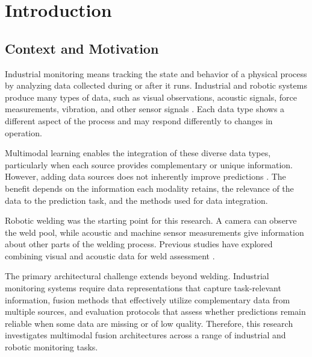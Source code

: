 
\chapter{Introduction}
\label{ch:introduction}



\section{Context and Motivation}

Industrial monitoring means tracking the state and behavior of a
physical process by analyzing data collected during or after it
runs. Industrial and robotic systems produce many types of data,
such as visual observations, acoustic signals, force measurements,
vibration, and other sensor signals
\parencite{Huo2022Multisensor,Thoduka2024Handover}.
Each data type shows a different aspect of the process and may
respond differently to changes in operation.

Multimodal learning enables the integration of these diverse data
types, particularly when each source provides complementary or
unique information. However, adding data sources does not inherently
improve predictions \parencite{Wang2020What}. The benefit depends on
the information each modality retains, the relevance of the data
to the prediction task, and the methods used for data integration.

Robotic welding was the starting point for this research. A camera
can observe the weld pool, while acoustic and machine sensor
measurements give information about other parts of the welding
process. Previous studies have explored combining visual and
acoustic data for weld assessment \parencite{P003,Hua2026Weld}.

The primary architectural challenge extends beyond welding.
Industrial monitoring systems require data representations that
capture task-relevant information, fusion methods that effectively
utilize complementary data from multiple sources, and evaluation
protocols that assess whether predictions remain reliable when some
data are missing or of low quality. Therefore, this research
investigates multimodal fusion architectures across a range of
industrial and robotic monitoring tasks.


